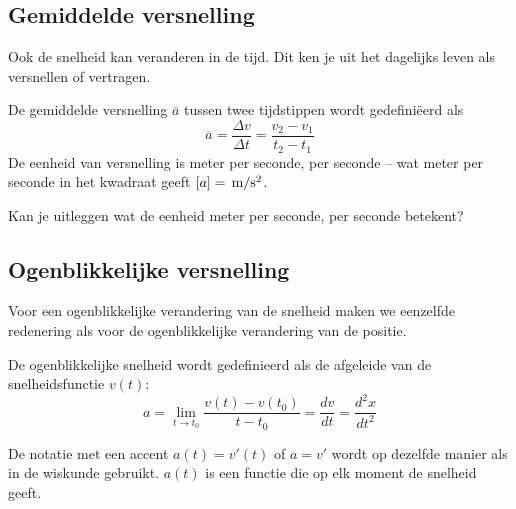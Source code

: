 \documentclass{ximera}
\begin{document}
	\author{Bart Lambregs}
    \xmsource\xmuitleg




	\subsection*{Gemiddelde versnelling}

	Ook de snelheid kan veranderen in de tijd. Dit ken je uit het dagelijks leven als versnellen of vertragen.
	
	\begin{definition}
	
	De gemiddelde versnelling \(\overline{a}\) tussen twee tijdstippen wordt gedefiniëerd als
	\[
	\overline{a}=\frac{\Delta v}{\Delta t}=\frac{v_2-v_1}{t_2-t_1}
	\]
	De eenheid van versnelling is meter per seconde, per seconde -- wat meter per seconde in het kwadraat geeft $[a]=\rm\,m/s^2$.
	\end{definition}
	
	\begin{denkvraag*}{}
	Kan je uitleggen wat de eenheid meter per seconde, per seconde betekent? 
	\end{denkvraag*}

	\subsection*{Ogenblikkelijke versnelling}

Voor een ogenblikkelijke verandering van de snelheid maken we eenzelfde redenering als voor de ogenblikkelijke verandering van de positie.

\begin{definition}
De ogenblikkelijke snelheid wordt gedefinieerd als de afgeleide van de snelheidsfunctie \(v(t)\):
\[
a=\lim_{t\to t_0}\frac{v(t)-v(t_0)}{t-t_0} = \frac{dv}{dt}=\frac{d^2x}{dt^2}
\]

De notatie met een accent $a(t)=v'(t)$ of $a=v'$ wordt op dezelfde manier als in de wiskunde gebruikt. $a(t)$ is een functie die op elk moment de snelheid geeft. 
\end{definition}
	
	
\end{document}
